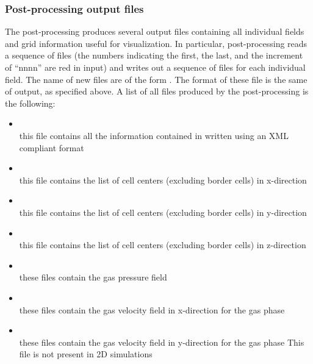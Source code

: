 \subsubsection{Post-processing output files}

The post-processing produces several output files
containing all individual fields and grid information useful
for visualization.
In particular, post-processing  reads a sequence
of  files (the numbers indicating the first, the last, and
the increment of ``nnnn'' are red in input)
and writes out a sequence of files for each individual field.
The name of new files are of the form .
The format of these file is the same of output, as specified above.
A list of all files produced by the post-processing is the following:

\begin{itemize}

\item {}  \\
      this file contains all the information contained in 
      written using an XML compliant format

\item {} \\
      this file contains the list of cell centers (excluding border cells) 
      in x-direction

\item {} \\
      this file contains the list of cell centers (excluding border cells) 
      in y-direction

\item {} \\
      this file contains the list of cell centers (excluding border cells) 
      in z-direction

\item {} \\
      these files contain the gas pressure field 

\item {} \\
      these files contain the gas velocity field in x-direction
      for the gas phase

\item {} \\
      these files contain the gas velocity field in y-direction
      for the gas phase
      This file is not present in 2D simulations


\end{itemize}
